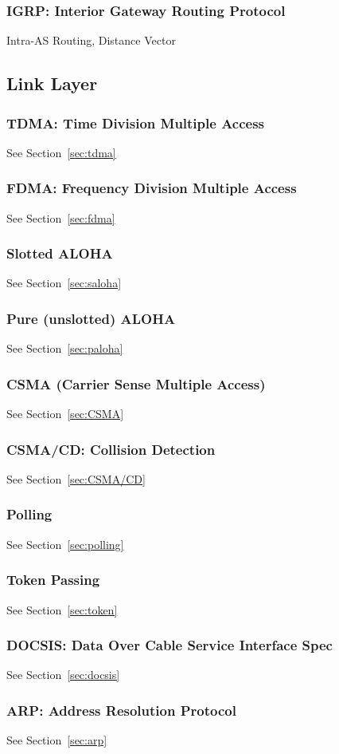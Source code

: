 \subsubsection{IGRP: Interior Gateway Routing Protocol}
Intra-AS Routing, Distance Vector

\subsection{Link Layer}
\subsubsection{TDMA: Time Division Multiple Access}
See Section~\ref{sec:tdma}
\subsubsection{FDMA: Frequency Division Multiple Access}
See Section~\ref{sec:fdma}
\subsubsection{Slotted ALOHA}
See Section~\ref{sec:saloha}
\subsubsection{Pure (unslotted) ALOHA}
See Section~\ref{sec:paloha}
\subsubsection{CSMA (Carrier Sense Multiple Access)}
See Section~\ref{sec:CSMA}
\subsubsection{CSMA/CD: Collision Detection}
See Section~\ref{sec:CSMA/CD}
\subsubsection{Polling}
See Section~\ref{sec:polling}
\subsubsection{Token Passing}
See Section~\ref{sec:token}
\subsubsection{DOCSIS: Data Over Cable Service Interface Spec}
See Section~\ref{sec:docsis}
\subsubsection{ARP: Address Resolution Protocol}
See Section~\ref{sec:arp}